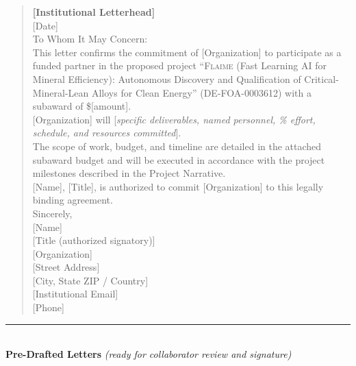 \documentclass[11pt,letterpaper]{article}
\newcommand{\flaime}{\textsc{Flaime}}
\newcommand{\projecttitle}{\flaime{} (Fast Learning AI for Mineral
Efficiency): Autonomous Discovery and Qualification of
Critical-Mineral-Lean Alloys for Clean Energy}
\begin{document}
\begin{quote}\small
\textbf{{[}Institutional Letterhead{]}}\\[4pt]
{[}Date{]}\\[6pt]
To Whom It May Concern:\\[4pt]
This letter confirms the commitment of {[}Organization{]} to participate as a
funded partner in the proposed project ``\projecttitle{}''
(DE-FOA-0003612) with a subaward of \${[}amount{]}.\\[4pt]
{[}Organization{]} will {[}\emph{specific deliverables, named personnel,
\% effort, schedule, and resources committed}{]}.\\[4pt]
The scope of work, budget, and timeline are detailed in the attached subaward
budget and will be executed in accordance with the project milestones
described in the Project Narrative.\\[4pt]
{[}Name{]}, {[}Title{]}, is authorized to commit {[}Organization{]} to this
legally binding agreement.\\[12pt]
Sincerely,\\[4pt]
{[}Name{]}\\
{[}Title (authorized signatory){]}\\
{[}Organization{]}\\
{[}Street Address{]}\\
{[}City, State ZIP / Country{]}\\
{[}Institutional Email{]}\\
{[}Phone{]}
\end{quote}

\bigskip
\noindent\rule{\textwidth}{0.4pt}\\
\textbf{\large Pre-Drafted Letters} \textit{(ready for collaborator review and signature)}








\end{document}
